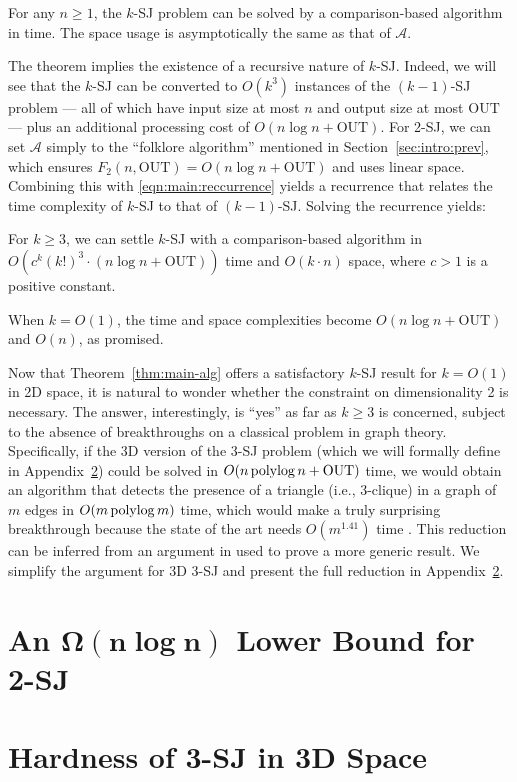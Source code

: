 \documentclass[sigconf]{acmart}
\def\vgap{\vspace{0mm}}
\def\A{\mathcal{A}}
\def\out{\mathrm{OUT}}
\begin{document}
\begin{theorem} \label{thm:main-recur}
    For any $n \ge 1$, the $k$-SJ problem can be solved by a comparison-based algorithm in
    \myeqn{
        O(k^3) \cdot \big( F_{k-1}(n, \out) + n \log n + \out \big)
        \label{eqn:main:reccurrence}
    }
    time.
    The space usage is asymptotically the same as that of $\A$.
\end{theorem}

The theorem implies the existence of a recursive nature of $k$-SJ. Indeed, we will see that the $k$-SJ can be converted to $O(k^3)$ instances of the $(k-1)$-SJ problem --- all of which have input size at most $n$ and output size at most $\out$ --- plus an additional processing cost of $O(n \log n + \out)$. For 2-SJ, we can set $\A$ simply to the ``folklore algorithm'' mentioned in Section~\ref{sec:intro:prev}, which ensures $F_2(n, \out) = O(n \log n + \out)$ and uses linear space. Combining this with \eqref{eqn:main:reccurrence} yields a recurrence that relates the time complexity of $k$-SJ to that of $(k-1)$-SJ. Solving the recurrence yields: 

\begin{theorem} \label{thm:main-alg}
    For $k \ge 3$, we can settle $k$-SJ with a comparison-based algorithm in $O( c^k (k!)^3 \cdot (n \log n + \out))$ time and $O(k \cdot n)$ space, where $c > 1$ is a positive constant.
\end{theorem}

When $k = O(1)$, the time and space complexities become $O(n \log n + \out)$ and $O(n)$, as promised.

\vgap 

Now that Theorem~\ref{thm:main-alg} offers a satisfactory $k$-SJ result for $k = O(1)$ in 2D space, it is natural to wonder whether the constraint on dimensionality 2 is necessary. The answer, interestingly, is ``yes'' as far as $k \ge 3$ is concerned, subject to the absence of breakthroughs on a classical problem in graph theory. Specifically, if the 3D version of the 3-SJ problem (which we will formally define in Appendix~\ref{app:lb-cond}) could be solved in $O(n \polylog n + \out)$ time, we would obtain an algorithm that detects the presence of a triangle (i.e., 3-clique) in a graph of $m$ edges in $O(m \operatorname*{polylog} m)$ time, which would make a truly surprising breakthrough because the state of the art needs $O(m^{1.41})$ time \cite{ayz97}. This reduction can be inferred from an argument in \cite{kcko22} used to prove a more generic result. We simplify the argument for 3D 3-SJ and present the full reduction in Appendix~\ref{app:lb-cond}.



\balance

\appendix 

\section{An $\bm{\Omega(n \log n)}$ Lower Bound for 2-SJ} \label{app:lb}

\section{Hardness of 3-SJ in 3D Space} \label{app:lb-cond}

\end{document}
